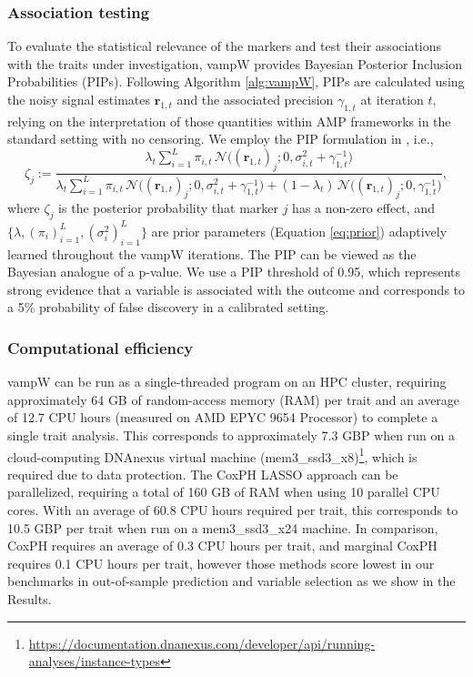 \subsubsection{Association testing}
\label{sec:methods_assoc}
To evaluate the statistical relevance of the markers and test their associations with the traits under investigation, vampW provides Bayesian Posterior Inclusion Probabilities (PIPs). Following Algorithm \ref{alg:vampW}, PIPs are calculated using the noisy signal estimates $\bm{r}_{1,t}$ and the associated precision $\gamma_{1,t}$ at  iteration $t$, relying on the interpretation of those quantities within AMP frameworks in the standard setting with no censoring. We employ the PIP formulation in \cite{Depope2026}, i.e.,
\begin{equation}
    \zeta_j := \frac{\lambda_t \sum_{i=1}^L \pi_{i,t}\, \mathcal{N}\big((\bm{r}_{1,t})_j; 0, \sigma_{i,t}^2 + \gamma_{1,t}^{-1}\big)}{\lambda_t \sum_{i=1}^L \pi_{i,t}\, \mathcal{N}\big((\bm{r}_{1,t})_j; 0, \sigma_{i,t}^2 + \gamma_{1,t}^{-1}\big) + (1-\lambda_t)\, \mathcal{N}\big((\bm{r}_{1,t})_j; 0, \gamma_{1,t}^{-1}\big)},
\end{equation}
where $\zeta_j$ is the posterior probability that marker $j$ has a non-zero effect, and $\{\lambda, \allowbreak (\pi_i)_{i=1}^L, \allowbreak (\sigma_i^2)_{i=1}^L \}$ are prior parameters (Equation \ref{eq:prior}) adaptively learned throughout the vampW iterations. The PIP can be viewed as the Bayesian analogue of a p-value. We use a PIP threshold of 0.95, which represents strong evidence that a variable is associated with the outcome and corresponds to a 5\% probability of false discovery in a calibrated setting.

\subsubsection{Computational efficiency} 
vampW can be run as a single-threaded program on an HPC cluster, requiring approximately 64 GB of random-access memory (RAM) per trait and an average of 12.7 CPU hours (measured on AMD EPYC 9654 Processor) to complete a single trait analysis. This corresponds to approximately 7.3 GBP when run on a cloud-computing DNAnexus virtual machine (mem3\_ssd3\_x8)\footnote{\url{https://documentation.dnanexus.com/developer/api/running-analyses/instance-types}}, which is required due to data protection. The CoxPH LASSO approach can be parallelized, requiring a total of 160 GB of RAM when using 10 parallel CPU cores. With an average of 60.8 CPU hours required per trait, this corresponds to 10.5 GBP per trait when run on a mem3\_ssd3\_x24 machine. In comparison, CoxPH requires an average of 0.3 CPU hours per trait, and marginal CoxPH requires 0.1 CPU hours per trait, however those methods score lowest in our benchmarks in out-of-sample prediction and variable selection as we show in the Results.

